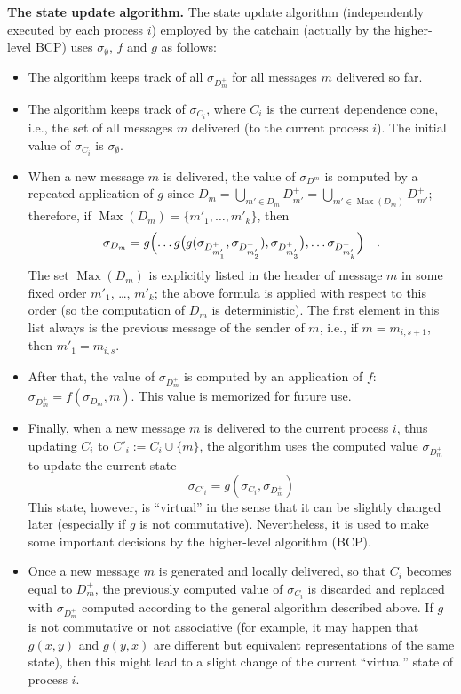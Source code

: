 \documentclass[12pt,oneside]{article}
\def\makepoint#1{\medbreak\noindent{\bf #1.\ }}
\def\nxsubpoint{\refstepcounter{subsubsection}%
  \smallbreak\makepoint{\thesubsubsection}}
\def\emb#1{\textbf{#1.}}
\def\Max{\operatorname{Max}}
\begin{document}
\nxsubpoint\emb{The state update algorithm}
The state update algorithm (independently executed by each process $i$) employed by the catchain (actually by the higher-level BCP) uses $\sigma_\emptyset$, $f$ and $g$ as follows:
\begin{itemize}
\item The algorithm keeps track of all $\sigma_{D^+_m}$ for all messages $m$ delivered so far.
\item The algorithm keeps track of $\sigma_{C_i}$, where $C_i$ is the current dependence cone, i.e., the set of all messages $m$ delivered (to the current process $i$). The initial value of $\sigma_{C_i}$ is $\sigma_\emptyset$.
\item When a new message $m$ is delivered, the value of $\sigma_{D^m}$ is computed by a repeated application of $g$ since $D_m=\bigcup_{m'\in D_m}D^+_{m'}=\bigcup_{m'\in\Max(D_m)}D^+_{m'}$; therefore, if $\Max(D_m)=\{m'_1,\ldots,m'_k\}$, then
  \begin{equation}\label{eq:merge.many}
    \sigma_{D_m}=g\Bigl(\ldots g\bigl(g(\sigma_{D^+_{m'_1}},\sigma_{D^+_{m'_2}}),\sigma_{D^+_{m'_3}}\bigr),\ldots \sigma_{D^+_{m'_k}}\Bigr)\quad. 
  \end{equation}
The set $\Max(D_m)$ is explicitly listed in the header of message $m$ in some fixed order $m'_1$, \dots, $m'_k$; the above formula is applied with respect to this order (so the computation of $D_m$ is deterministic). The first element in this list always is the previous message of the sender of $m$, i.e., if $m=m_{i,s+1}$, then $m'_1=m_{i,s}$.
\item After that, the value of $\sigma_{D^+_m}$ is computed by an application of $f$: $\sigma_{D^+_m}=f(\sigma_{D_m},m)$. This value is memorized for future use.
\item Finally, when a new message $m$ is delivered to the current process $i$, thus updating $C_i$ to $C'_i:=C_i\cup\{m\}$, the algorithm uses the computed value $\sigma_{D^+_m}$ to update the current state
  \begin{equation}
    \sigma_{C'_i}=g(\sigma_{C_i},\sigma_{D^+_m})
  \end{equation}
  This state, however, is ``virtual'' in the sense that it can be slightly changed later (especially if $g$ is not commutative). Nevertheless, it is used to make some important decisions by the higher-level algorithm (BCP).
\item Once a new message $m$ is generated and locally delivered, so that $C_i$ becomes equal to $D^+_m$, the previously computed value of $\sigma_{C_i}$ is discarded and replaced with $\sigma_{D^+_m}$ computed according to the general algorithm described above. If $g$ is not commutative or not associative (for example, it may happen that $g(x,y)$ and $g(y,x)$ are different but equivalent representations of the same state), then this might lead to a slight change of the current ``virtual'' state of process $i$.

\end{itemize}
\end{document}
